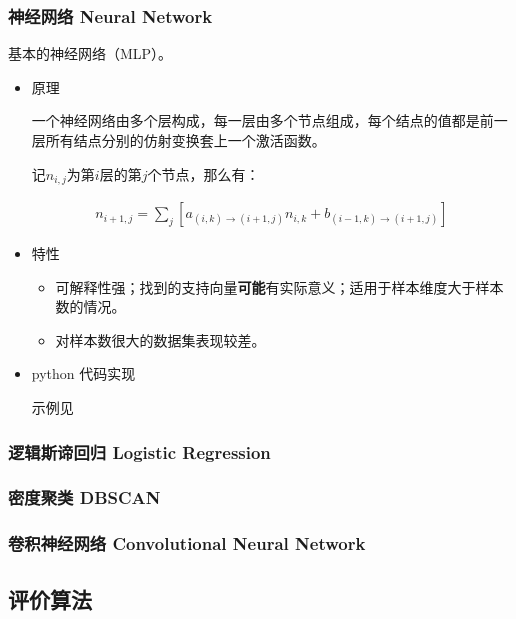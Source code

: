 \documentclass{article}
\begin{document}
\subsubsection{神经网络 Neural Network}

基本的神经网络（MLP）。

\begin{itemize}

\item{原理}

一个神经网络由多个层构成，每一层由多个节点组成，每个结点的值都是前一层所有结点分别的仿射变换套上一个激活函数。

记$n_{i, j}$为第$i$层的第$j$个节点，那么有：

\[\begin{split}
    n_{i + 1, j} = \sum_j \left[a_{(i, k) \rightarrow (i + 1, j)}n_{i, k} + b_{(i - 1, k) \rightarrow (i + 1, j)}\right]
\end{split}\]

\item{特性}

\begin{itemize}
    \item 可解释性强；找到的支持向量\textbf{可能}有实际意义；适用于样本维度大于样本数的情况。
    \item 对样本数很大的数据集表现较差。
\end{itemize}

\item{python 代码实现}

示例见

\end{itemize}

\subsubsection{逻辑斯谛回归 Logistic Regression}

\subsubsection{密度聚类 DBSCAN}

\subsubsection{卷积神经网络 Convolutional Neural Network}

\subsection{评价算法}
\end{document}
